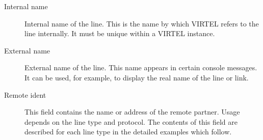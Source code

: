 \documentclass[letterpaper,10pt,english]{sphinxmanual}
\begin{document}
\begin{description}
\item[{Internal name}] \leavevmode
Internal name of the line. This is the name by which VIRTEL refers to the line internally. It must be unique within a VIRTEL instance.

\item[{External name}] \leavevmode
External name of the line. This name appears in certain console messages. It can be used, for example, to display the real name of the line or link.

\item[{Remote ident}] \leavevmode
This field contains the name or address of the remote partner. Usage
depends on the line type and protocol. The contents of this field
are described for each line type in the detailed examples which
follow.

\end{description}
\end{document}
